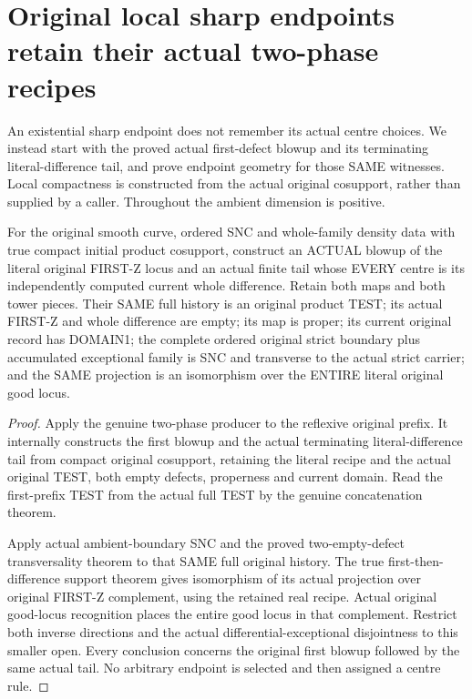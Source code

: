 \section{Original local sharp endpoints retain their actual two-phase recipes}

An existential sharp endpoint does not remember its actual centre
choices. We instead start with the proved actual first-defect blowup
and its terminating literal-difference tail, and prove endpoint
geometry for those SAME witnesses. Local compactness is constructed
from the actual original cosupport, rather than supplied by a caller.
Throughout the ambient dimension is positive.

\begin{theorem}
\label{hir:sharp-original-curve-compact-retained-two-phase-recipe}
\leanok
For the original smooth curve, ordered SNC and whole-family density
data with true compact initial product cosupport, construct an ACTUAL
blowup of the literal original FIRST-Z locus and an actual finite tail
whose EVERY centre is its independently computed current whole
difference. Retain both maps and both tower pieces. Their SAME full
history is an original product TEST; its actual FIRST-Z and whole
difference are empty; its map is proper; its current original record
has DOMAIN1; the complete ordered original strict boundary plus
accumulated exceptional family is SNC and transverse to the actual
strict carrier; and the SAME projection is an isomorphism over the
ENTIRE literal original good locus.
\end{theorem}
\begin{proof}
Apply the genuine two-phase producer to the reflexive original prefix.
It internally constructs the first blowup and the actual terminating
literal-difference tail from compact original cosupport, retaining the
literal recipe and the actual original TEST, both empty defects,
properness and current domain. Read the first-prefix TEST from the
actual full TEST by the genuine concatenation theorem.

Apply actual ambient-boundary SNC and the proved two-empty-defect
transversality theorem to that SAME full original history. The true
first-then-difference support theorem gives isomorphism of its actual
projection over original FIRST-Z complement, using the retained real
recipe. Actual original good-locus recognition places the entire good
locus in that complement. Restrict both inverse directions and the
actual differential-exceptional disjointness to this smaller open.
Every conclusion concerns the original first blowup followed by the
same actual tail. No arbitrary endpoint is selected and then assigned
a centre rule.
\end{proof}


